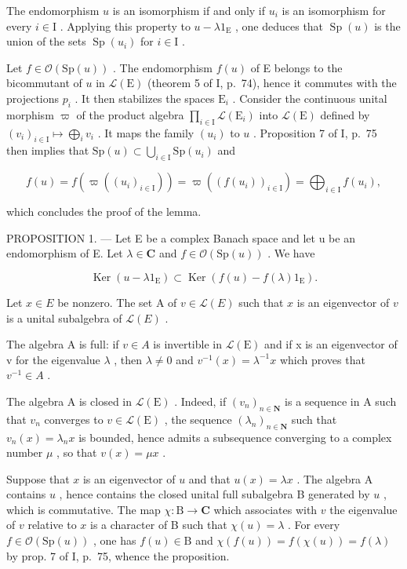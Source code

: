 The endomorphism \(u\) is an isomorphism if and only if \(u_i\) is an isomorphism for every \(i \in \mathrm{I}\) . Applying this property to \(u - \lambda 1_{\mathrm{E}}\) , one deduces that \(\operatorname{Sp}(u)\) is the union of the sets \(\operatorname{Sp}(u_i)\) for \(i \in \mathrm{I}\) .

Let \(f \in \mathcal{O}(\mathrm{Sp}(u))\) . The endomorphism \(f(u)\) of E belongs to the bicommutant of \(u\) in \(\mathcal{L}(\mathrm{E})\) (theorem 5 of I, p.~74), hence it commutes with the projections \(p_i\) . It then stabilizes the spaces \(\mathrm{E}_i\) . Consider the continuous unital morphism \(\varpi\) of the product algebra \(\prod_{i \in \mathrm{I}} \mathcal{L}(\mathrm{E}_i)\) into \(\mathcal{L}(\mathrm{E})\) defined by \((v_i)_{i \in \mathrm{I}} \mapsto \bigoplus_i v_i\) . It maps the family \((u_i)\) to \(u\) . Proposition 7 of I, p.~75 then implies that \(\mathrm{Sp}(u) \subset \bigcup_{i \in \mathrm{I}} \mathrm{Sp}(u_i)\) and

\[
f (u) = f (\varpi ((u _ {i}) _ {i \in \mathrm{I}})) = \varpi ((f (u _ {i})) _ {i \in \mathrm{I}}) = \bigoplus_ {i \in \mathrm{I}} f (u _ {i}),
\]

which concludes the proof of the lemma.

PROPOSITION 1. --- Let E be a complex Banach space and let u be an endomorphism of E. Let \(\lambda \in \mathbf{C}\) and \(f \in \mathcal{O}(\mathrm{Sp}(u))\) . We have

\[
\operatorname{Ker} (u - \lambda 1 _ {\mathrm{E}}) \subset \operatorname{Ker} (f (u) - f (\lambda) 1 _ {\mathrm{E}}).
\]

Let \(x \in E\) be nonzero. The set A of \(v \in \mathcal{L}(E)\) such that \(x\) is an eigenvector of \(v\) is a unital subalgebra of \(\mathcal{L}(E)\) .

The algebra A is full: if \(v \in A\) is invertible in \(\mathcal{L}(\mathrm{E})\) and if x is an eigenvector of v for the eigenvalue \(\lambda\) , then \(\lambda \neq 0\) and \(v^{-1}(x) = \lambda^{-1}x\) which proves that \(v^{-1} \in A\) .

The algebra A is closed in \(\mathcal{L}(\mathrm{E})\) . Indeed, if \((v_n)_{n\in \mathbf{N}}\) is a sequence in A such that \(v_{n}\) converges to \(v\in \mathcal{L}(\mathrm{E})\) , the sequence \((\lambda_{n})_{n\in \mathbf{N}}\) such that \(v_{n}(x) = \lambda_{n}x\) is bounded, hence admits a subsequence converging to a complex number \(\mu\) , so that \(v(x) = \mu x\) .

Suppose that \(x\) is an eigenvector of \(u\) and that \(u(x) = \lambda x\) . The algebra A contains \(u\) , hence contains the closed unital full subalgebra B generated by \(u\) , which is commutative. The map \(\chi \colon \mathrm{B} \to \mathbf{C}\) which associates with \(v\) the eigenvalue of \(v\) relative to \(x\) is a character of B such that \(\chi(u) = \lambda\) . For every \(f \in \mathcal{O}(\mathrm{Sp}(u))\) , one has \(f(u) \in \mathrm{B}\) and \(\chi(f(u)) = f(\chi(u)) = f(\lambda)\) by prop. 7 of I, p.~75, whence the proposition.

